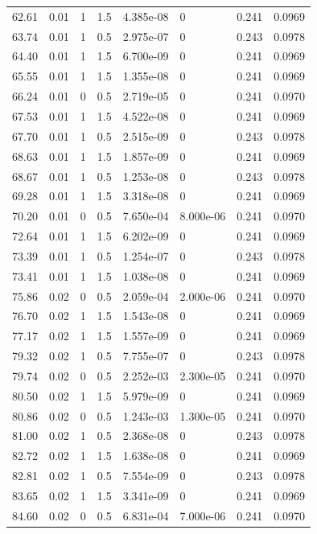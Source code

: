 \documentclass[preview]{standalone}
\begin{document}
{{{\begin{tabular}{L{1.2cm}C{1.2cm} C{0.3cm}C{0.5cm} C{1.4cm}C{1.4cm} C{1.4cm}C{1.4cm}}
  62.61  &  0.01  & 1     & 1.5 &  4.385e-08  & 0  & 0.241 &  0.0969   \\ 
  63.74  &  0.01  & 1     & 0.5 &  2.975e-07  & 0  & 0.243 &  0.0978   \\ 
  64.40  &  0.01  & 1     & 1.5 &  6.700e-09  & 0  & 0.241 &  0.0969   \\ 
  65.55  &  0.01  & 1     & 1.5 &  1.355e-08  & 0  & 0.241 &  0.0969   \\ 
  66.24  &  0.01  & 0     & 0.5 &  2.719e-05  & 0  & 0.241 &  0.0970   \\ 
  67.53  &  0.01  & 1     & 1.5 &  4.522e-08  & 0  & 0.241 &  0.0969   \\ 
  67.70  &  0.01  & 1     & 0.5 &  2.515e-09  & 0  & 0.243 &  0.0978   \\ 
  68.63  &  0.01  & 1     & 1.5 &  1.857e-09  & 0  & 0.241 &  0.0969   \\ 
  68.67  &  0.01  & 1     & 0.5 &  1.253e-08  & 0  & 0.243 &  0.0978   \\ 
  69.28  &  0.01  & 1     & 1.5 &  3.318e-08  & 0  & 0.241 &  0.0969   \\ 
  70.20  &  0.01  & 0     & 0.5 &  7.650e-04  & 8.000e-06  & 0.241 &  0.0970   \\ 
  72.64  &  0.01  & 1     & 1.5 &  6.202e-09  & 0  & 0.241 &  0.0969   \\ 
  73.39  &  0.01  & 1     & 0.5 &  1.254e-07  & 0  & 0.243 &  0.0978   \\ 
  73.41  &  0.01  & 1     & 1.5 &  1.038e-08  & 0  & 0.241 &  0.0969   \\ 
  75.86  &  0.02  & 0     & 0.5 &  2.059e-04  & 2.000e-06  & 0.241 &  0.0970   \\ 
  76.70  &  0.02  & 1     & 1.5 &  1.543e-08  & 0  & 0.241 &  0.0969   \\ 
  77.17  &  0.02  & 1     & 1.5 &  1.557e-09  & 0  & 0.241 &  0.0969   \\ 
  79.32  &  0.02  & 1     & 0.5 &  7.755e-07  & 0  & 0.243 &  0.0978   \\ 
  79.74  &  0.02  & 0     & 0.5 &  2.252e-03  & 2.300e-05  & 0.241 &  0.0970   \\ 
  80.50  &  0.02  & 1     & 1.5 &  5.979e-09  & 0  & 0.241 &  0.0969   \\ 
  80.86  &  0.02  & 0     & 0.5 &  1.243e-03  & 1.300e-05  & 0.241 &  0.0970   \\ 
  81.00  &  0.02  & 1     & 0.5 &  2.368e-08  & 0  & 0.243 &  0.0978   \\ 
  82.72  &  0.02  & 1     & 1.5 &  1.638e-08  & 0  & 0.241 &  0.0969   \\ 
  82.81  &  0.02  & 1     & 0.5 &  7.554e-09  & 0  & 0.243 &  0.0978   \\ 
  83.65  &  0.02  & 1     & 1.5 &  3.341e-09  & 0  & 0.241 &  0.0969   \\ 
  84.60  &  0.02  & 0     & 0.5 &  6.831e-04  & 7.000e-06  & 0.241 &  0.0970   \\ 
\hline 
\end{tabular} 

}}}
\end{document}
